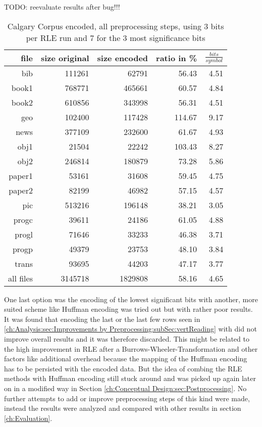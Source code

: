 {TODO: reevaluate results after bug!!!
\begin{table}[H]
	\centering
	\begin{tabular}{r|r|r|r|r}	
		file & size original & size encoded & ratio in \% & $\frac{bits}{symbol}$\\
		\hline
		bib & 111261 & 62791 & 56.43 & 4.51\\
		book1 & 768771 & 465661 & 60.57 & 4.84 \\
		book2 & 610856 & 343998 & 56.31 & 4.51\\
		geo & 102400 & 117428 & 114.67 & 9.17\\
		news & 377109 & 232600 & 61.67 & 4.93\\
		obj1 & 21504 & 22242 & 103.43 & 8.27\\
		obj2& 246814 & 180879 & 73.28 & 5.86\\		 
		paper1 & 53161 & 31608 & 59.45 & 4.75\\		 
		paper2& 82199 & 46982 & 57.15 & 4.57\\		 
		pic & 513216 & 196148 & 38.21 & 3.05\\		 
		progc & 39611 & 24186 & 61.05 & 4.88\\		 
		progl & 71646 & 33233 & 46.38 & 3.71\\		 
		progp & 49379 & 23753 & 48.10 & 3.84\\		 
		trans & 93695 & 44203 & 47.17 & 3.77\\
		\hline
		all files & 3145718 & 1829808 & 58.16 & 4.65
	\end{tabular}
	\caption{Calgary Corpus encoded, all preprocessing steps, using 3 bits per RLE run and 7 for the 3 most significance bits}
	\label{tab:t5:Calgary Corpus encoded, all preprocessing steps, using 3 bits per RLE run and 7 for the 3 most significance bits}
\end{table}
\par{
One last option was the encoding of the lowest significant bits with another, more suited scheme like Huffman encoding was tried out but with rather poor results. It was found that encoding the last or the last few rows seen in \ref{ch:Analysis:sec:Improvements by Preprocessing:subSec:vertReading} with did not improve overall results and it was therefore discarded. This might be related to the high improvement in RLE after a Burrows-Wheeler-Transformation and other factors like additional overhead because the mapping of the Huffman encoding has to be persisted with the encoded data. But the idea of combing the RLE methods with Huffman encoding still stuck around and was picked up again later on in a modified way in Section \ref{ch:Conceptual Design:sec:Postprocessing}. No further attempts to add or improve preprocessing steps of this kind were made, instead the results were analyzed and compared with other results in section \ref{ch:Evaluation}.
}
}

